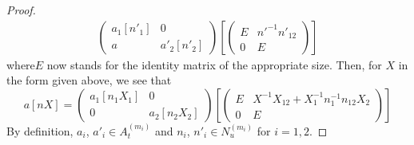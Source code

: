 \begin{proof}
\begin{align*}
\begin{pmatrix}
a_{1}[n'_{1}] & 0\\
a & a'_{2}[n'_{2}]
\end{pmatrix}
\left[
\begin{pmatrix}
E & {n'}^{-1}n'_{12}\\
0 & E
\end{pmatrix}
\right]
\end{align*}
where\pageoriginale $E$ now stands for the identity matrix of the
appropriate size. Then, for $X$ in the form given above, we see that
$$
a[nX]=
\begin{pmatrix}
a_{1}[n_{1}X_{1}] & 0\\
0 & a_{2}[n_{2}X_{2}]
\end{pmatrix}
\left[
\begin{pmatrix}
E & X^{-1}X_{12}+X^{-1}_{1}n^{-1}_{1}n_{12}X_{2}\\
0 & E
\end{pmatrix}
\right]
$$
By definition, $a_{i}$, $a'_{i}\in A^{(m_{i})}_{t}$ and $n_{i}$,
$n'_{i}\in N^{(m_{i})}_{u}$ for $i=1,2$.


\end{proof}
